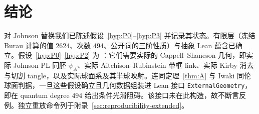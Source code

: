 \section{结论}

对 Johnson 替换我们已陈述假设~\ref{hyp:P0}--\ref{hyp:P3} 并记录其状态。有限层（冻结 Burau 计算的值 $2624$、次数 $494$、公开词的三阶性质）与抽象 Lean 蕴含已确立。假设~\ref{hyp:P0}--\ref{hyp:P2} 为 \Open：它们需要实际的 Cappell--Shaneson 几何，即实际 Johnson PL 同胚 $\psi_A$、实际 Aitchison--Rubinstein 带框 link、实际 Kirby 消去与切割 tangle，以及实际球面系及其半球映射。连同定理~\ref{thm:A} 与 Iwaki 同伦球面判据，一旦这些假设确立且几何数据组装进 Lean 接口 \texttt{ExternalGeometry}，即在 quantum degree $494$ 给出条件光滑阻碍。该接口未在此构造，故不断言反例。独立重放命令列于附录~\ref{sec:reproducibility-extended}。
